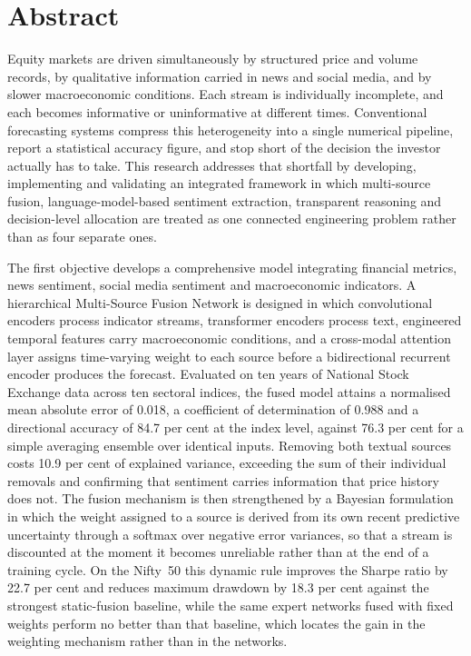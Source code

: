 \chapter*{Abstract}

Equity markets are driven simultaneously by structured price and volume records, by
qualitative information carried in news and social media, and by slower macroeconomic
conditions. Each stream is individually incomplete, and each becomes informative or
uninformative at different times. Conventional forecasting systems compress this
heterogeneity into a single numerical pipeline, report a statistical accuracy figure, and
stop short of the decision the investor actually has to take. This research addresses that
shortfall by developing, implementing and validating an integrated framework in which
multi-source fusion, language-model-based sentiment extraction, transparent reasoning and
decision-level allocation are treated as one connected engineering problem rather than as
four separate ones.

The first objective develops a comprehensive model integrating financial metrics, news
sentiment, social media sentiment and macroeconomic indicators. A hierarchical
Multi-Source Fusion Network is designed in which convolutional encoders process indicator
streams, transformer encoders process text, engineered temporal features carry
macroeconomic conditions, and a cross-modal attention layer assigns time-varying weight to
each source before a bidirectional recurrent encoder produces the forecast. Evaluated on
ten years of National Stock Exchange data across ten sectoral indices, the fused model
attains a normalised mean absolute error of 0.018, a coefficient of determination of 0.988
and a directional accuracy of 84.7 per cent at the index level, against 76.3 per cent for
a simple averaging ensemble over identical inputs. Removing both textual sources costs
10.9 per cent of explained variance, exceeding the sum of their individual removals and
confirming that sentiment carries information that price history does not. The fusion
mechanism is then strengthened by a Bayesian formulation in which the weight assigned to a
source is derived from its own recent predictive uncertainty through a softmax over
negative error variances, so that a stream is discounted at the moment it becomes
unreliable rather than at the end of a training cycle. On the Nifty~50 this dynamic rule
improves the Sharpe ratio by 22.7 per cent and reduces maximum drawdown by 18.3 per cent
against the strongest static-fusion baseline, while the same expert networks fused with
fixed weights perform no better than that baseline, which locates the gain in the weighting
mechanism rather than in the networks.

